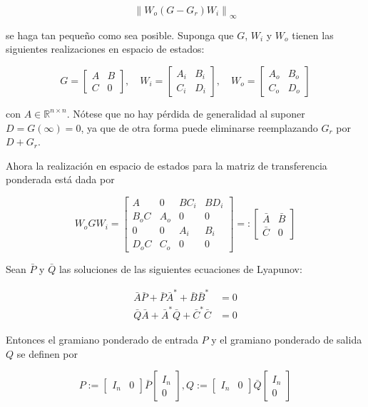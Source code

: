 $$
\left\|W_{o}\left(G-G_{r}\right) W_{i}\right\|_{\infty}
$$

se haga tan pequeño como sea posible. Suponga que $G$, $W_{i}$ y $W_{o}$ tienen las siguientes realizaciones en espacio de estados:

$$
G=\left[\begin{array}{c|c}
A & B \\
\hline C & 0
\end{array}\right], \quad W_{i}=\left[\begin{array}{c|c}
A_{i} & B_{i} \\
\hline C_{i} & D_{i}
\end{array}\right], \quad W_{o}=\left[\begin{array}{c|c}
A_{o} & B_{o} \\
\hline C_{o} & D_{o}
\end{array}\right]
$$

con $A \in \mathbb{R}^{n \times n}$. Nótese que no hay pérdida de generalidad al suponer $D=G(\infty)=0$, ya que de otra forma puede eliminarse reemplazando $G_{r}$ por $D+G_{r}$.

Ahora la realización en espacio de estados para la matriz de transferencia ponderada está dada por

$$
W_{o} G W_{i}=\left[\begin{array}{ccc|c}
A & 0 & B C_{i} & B D_{i} \\
B_{o} C & A_{o} & 0 & 0 \\
0 & 0 & A_{i} & B_{i} \\
\hline D_{o} C & C_{o} & 0 & 0
\end{array}\right]=:\left[\begin{array}{c|c}
\bar{A} & \bar{B} \\
\hline \bar{C} & 0
\end{array}\right]
$$

Sean $\bar{P}$ y $\bar{Q}$ las soluciones de las siguientes ecuaciones de Lyapunov:


\begin{align*}
\bar{A} \bar{P}+\bar{P} \bar{A}^{*}+\bar{B} \bar{B}^{*} & =0  \tag{7.17}\\
\bar{Q} \bar{A}+\bar{A}^{*} \bar{Q}+\bar{C}^{*} \bar{C} & =0 \tag{7.18}
\end{align*}


Entonces el gramiano ponderado de entrada $P$ y el gramiano ponderado de salida $Q$ se definen por

$$
P:=\left[\begin{array}{ll}
I_{n} & 0
\end{array}\right] \bar{P}\left[\begin{array}{c}
I_{n} \\
0
\end{array}\right], Q:=\left[\begin{array}{ll}
I_{n} & 0
\end{array}\right] \bar{Q}\left[\begin{array}{c}
I_{n} \\
0
\end{array}\right]
$$

